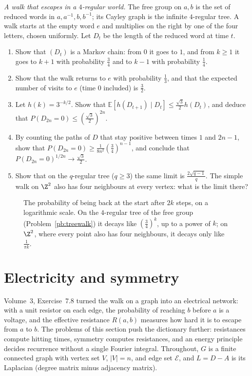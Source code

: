 \begin{exercise}[$\star\star\star$]\label{pb:treewalk}
\emph{A walk that escapes in a $4$-regular world.} The free group on $a,b$ is the set of reduced words in $a,a^{-1},b,b^{-1}$; its Cayley
graph is the infinite $4$-regular tree. A walk starts at the empty word $e$ and multiplies on the right by one of the four
letters, chosen uniformly. Let $D_t$ be the length of the reduced word at time $t$.
\begin{enumerate}[label=(\alph*)]
\item Show that $(D_t)$ is a Markov chain: from $0$ it goes to $1$, and from $k\ge1$ it goes to $k+1$ with probability $\frac34$ and to
$k-1$ with probability $\frac14$.
\item Show that the walk returns to $e$ with probability $\frac13$, and that the expected number of visits to $e$ (time $0$ included) is $\frac32$.
\item Let $h(k)=3^{-k/2}$. Show that $\mathbb E[h(D_{t+1})\mid D_t]\le\frac{\sqrt3}2h(D_t)$, and deduce that $P(D_{2n}=0)\le(\frac{\sqrt3}2)^{2n}$.
\item By counting the paths of $D$ that stay positive between times $1$ and $2n-1$, show that $P(D_{2n}=0)\ge\frac1{8n^2}(\frac34)^{n-1}$, and conclude that
$P(D_{2n}=0)^{1/2n}\to\frac{\sqrt3}2$.
\item Show that on the $q$-regular tree ($q\ge3$) the same limit is $\frac{2\sqrt{q-1}}q$. The simple walk on $\Z^2$ also has four neighbours at
every vertex: what is the limit there?
\end{enumerate}
\end{exercise}

\begin{figure}[ht]
\centering
{}
\caption{The probability of being back at the start after $2k$ steps, on a logarithmic scale. On the $4$-regular tree of the free group
(Problem~\ref{pb:treewalk}) it decays like $(\frac34)^k$, up to a power of $k$; on $\Z^2$, where every point also has four neighbours, it decays only like
$\frac1{\pi k}$.}
\label{fig:treereturn}
\end{figure}

\section{Electricity and symmetry}

Volume~3, Exercise~7.8 turned the walk on a graph into an electrical network: with a unit resistor on each edge, the probability of
reaching $b$ before $a$ is a voltage, and the effective resistance $R(a,b)$ measures how hard it is to escape from $a$ to $b$. The
problems of this section push the dictionary further: resistances compute hitting times, symmetry computes resistances, and an
energy principle decides recurrence without a single Fourier integral. Throughout, $G$ is a finite connected graph with vertex set $V$,
$|V|=n$, and edge set $\mathcal E$, and $L=D-A$ is its Laplacian (degree matrix minus adjacency matrix).

